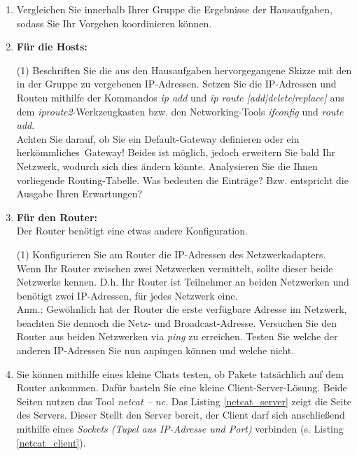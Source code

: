 \documentclass[paper=a4,fontsize=11pt]{scrartcl}%
\numberwithin{equation}{section}
\begin{document}
\begin{enumerate}
	\item Vergleichen Sie innerhalb Ihrer Gruppe die Ergebnisse der Hausaufgaben, sodass Sie Ihr Vorgehen koordinieren können.
	\item \textbf{Für die Hosts:}\\
	\begin{tasks}(1)
		\task Beschriften Sie die aus den Hausaufgaben hervorgegangene Skizze mit den in der Gruppe zu vergebenen IP-Adressen.
		\task Setzen Sie die IP-Adressen und Routen mithilfe der Kommandos \emph{ip add} und \emph{ip route [add|delete|replace]} aus dem \emph{iproute2}-Werkzeugkasten bzw. den Networking-Tools \emph{ifconfig} und \emph{route add}.\\
		Achten Sie darauf, ob Sie ein Default-Gateway definieren oder ein \glqq herkömmliches\grqq\ Gateway! Beides ist möglich, jedoch erweitern Sie bald Ihr Netzwerk, wodurch sich dies ändern könnte.
		\task Analysieren Sie die Ihnen vorliegende Routing-Tabelle. Was bedeuten die Einträge? Bzw. entspricht die Ausgabe Ihren Erwartungen?
	\end{tasks}
	\item \textbf{Für den Router:}\\
	Der Router benötigt eine etwas andere Konfiguration. 
	\begin{tasks}(1)
		\task Konfigurieren Sie am Router die IP-Adressen des Netzwerkadapters. Wenn Ihr Router zwischen zwei Netzwerken vermittelt, sollte dieser beide Netzwerke kennen. D.h. Ihr Router ist Teilnehmer an beiden Netzwerken und benötigt zwei IP-Adressen, für jedes Netzwerk eine.\\
		Anm.: Gewöhnlich hat der Router die erste verfügbare Adresse im Netzwerk, beachten Sie dennoch die Netz- und Broadcast-Adresse.
		\task Versuchen Sie den Router aus beiden Netzwerken via \emph{ping} zu erreichen.
		\task Testen Sie welche der anderen IP-Adressen Sie nun anpingen können und welche nicht.
	\end{tasks}
	\item Sie können mithilfe eines kleine Chats testen, ob Pakete tatsächlich auf dem Router ankommen. Dafür basteln Sie eine kleine  Client-Server-Lösung. Beide Seiten nutzen das Tool \emph{netcat -- \emph{nc}}. Das Listing \ref{netcat_server} zeigt die Seite des Servers. Dieser Stellt den Server bereit, der Client darf sich anschließend mithilfe eines \emph{Sockets (Tupel aus IP-Adresse und Port)} verbinden (s. Listing \ref{netcat_client}). 
		

\end{enumerate}
\end{document}
